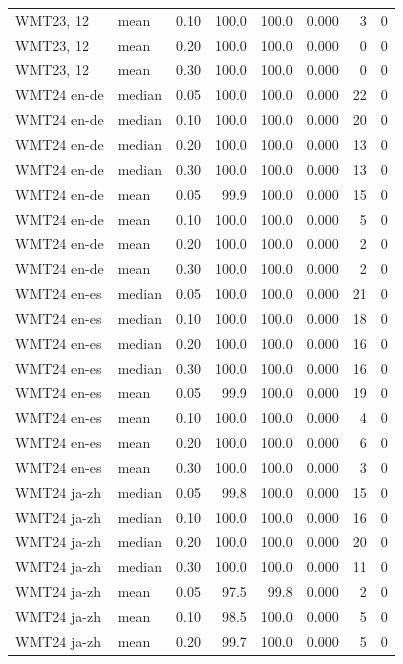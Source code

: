 \begin{table}[t]
\begin{tabular}{llrrrrrr}
WMT23, 12 & mean & 0.10 & 100.0 & 100.0 & 0.000 & 3 & 0 \\
WMT23, 12 & mean & 0.20 & 100.0 & 100.0 & 0.000 & 0 & 0 \\
WMT23, 12 & mean & 0.30 & 100.0 & 100.0 & 0.000 & 0 & 0 \\
WMT24 en-de & median & 0.05 & 100.0 & 100.0 & 0.000 & 22 & 0 \\
WMT24 en-de & median & 0.10 & 100.0 & 100.0 & 0.000 & 20 & 0 \\
WMT24 en-de & median & 0.20 & 100.0 & 100.0 & 0.000 & 13 & 0 \\
WMT24 en-de & median & 0.30 & 100.0 & 100.0 & 0.000 & 13 & 0 \\
WMT24 en-de & mean & 0.05 & 99.9 & 100.0 & 0.000 & 15 & 0 \\
WMT24 en-de & mean & 0.10 & 100.0 & 100.0 & 0.000 & 5 & 0 \\
WMT24 en-de & mean & 0.20 & 100.0 & 100.0 & 0.000 & 2 & 0 \\
WMT24 en-de & mean & 0.30 & 100.0 & 100.0 & 0.000 & 2 & 0 \\
WMT24 en-es & median & 0.05 & 100.0 & 100.0 & 0.000 & 21 & 0 \\
WMT24 en-es & median & 0.10 & 100.0 & 100.0 & 0.000 & 18 & 0 \\
WMT24 en-es & median & 0.20 & 100.0 & 100.0 & 0.000 & 16 & 0 \\
WMT24 en-es & median & 0.30 & 100.0 & 100.0 & 0.000 & 16 & 0 \\
WMT24 en-es & mean & 0.05 & 99.9 & 100.0 & 0.000 & 19 & 0 \\
WMT24 en-es & mean & 0.10 & 100.0 & 100.0 & 0.000 & 4 & 0 \\
WMT24 en-es & mean & 0.20 & 100.0 & 100.0 & 0.000 & 6 & 0 \\
WMT24 en-es & mean & 0.30 & 100.0 & 100.0 & 0.000 & 3 & 0 \\
WMT24 ja-zh & median & 0.05 & 99.8 & 100.0 & 0.000 & 15 & 0 \\
WMT24 ja-zh & median & 0.10 & 100.0 & 100.0 & 0.000 & 16 & 0 \\
WMT24 ja-zh & median & 0.20 & 100.0 & 100.0 & 0.000 & 20 & 0 \\
WMT24 ja-zh & median & 0.30 & 100.0 & 100.0 & 0.000 & 11 & 0 \\
WMT24 ja-zh & mean & 0.05 & 97.5 & 99.8 & 0.000 & 2 & 0 \\
WMT24 ja-zh & mean & 0.10 & 98.5 & 100.0 & 0.000 & 5 & 0 \\
WMT24 ja-zh & mean & 0.20 & 99.7 & 100.0 & 0.000 & 5 & 0 \\

\end{tabular}
\end{table}
